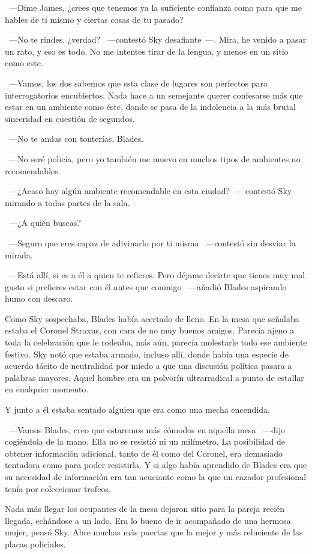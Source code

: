 ~---Dime James, ¿crees que tenemos ya la suficiente confianza como para que me hables de ti mismo y ciertas cosas de tu pasado?

~---No te rindes, ¿verdad? ~---contestó Sky desafiante~---. Mira, he venido a pasar un rato, y eso es todo. No me intentes tirar de la lengua, y menos en un sitio como este.

~---Vamos, los dos sabemos que esta clase de lugares son perfectos para interrogatorios encubiertos. Nada hace a un semejante querer confesarse más que estar en un ambiente como éste, donde se pasa de la indolencia a la más brutal sinceridad en cuestión de segundos.

~---No te andas con tonterías, Blades.

~---No seré policía, pero yo también me muevo en muchos tipos de ambientes no recomendables.

~---¿Acaso hay algún ambiente recomendable en esta ciudad? ~---contestó Sky mirando a todas partes de la sala.

~---¿A quién buscas?

~---Seguro que eres capaz de adivinarlo por ti misma ~---contestó sin desviar la mirada.

~---Está allí, si es a él a quien te refieres. Pero déjame decirte que tienes muy mal gusto si prefieres estar con él antes que conmigo ~---añadió Blades aspirando humo con descaro.

Como Sky sospechaba, Blades había acertado de lleno. En la mesa que señalaba estaba el Coronel Straxus, con cara de no muy buenos amigos. Parecía ajeno a toda la celebración que le rodeaba, más aún, parecía molestarle todo ese ambiente festivo. Sky notó que estaba armado, incluso allí, donde había una especie de acuerdo tácito de neutralidad por miedo a que una discusión política pasara a palabras mayores. Aquel hombre era un polvorín ultrarradical a punto de estallar en cualquier momento.

Y junto a él estaba sentado alguien que era como una mecha encendida.

~---Vamos Blades, creo que estaremos más cómodos en aquella mesa ~---dijo cogiéndola de la mano. Ella no se resistió ni un milímetro. La posibilidad de obtener información adicional, tanto de él como del Coronel, era demasiado tentadora como para poder resistirla. Y si algo había aprendido de Blades era que su necesidad de información era tan acuciante como la que un cazador profesional tenía por coleccionar trofeos.

Nada más llegar los ocupantes de la mesa dejaron sitio para la pareja recién llegada, echándose a un lado. Era lo bueno de ir acompañado de una hermosa mujer, pensó Sky. Abre muchas más puertas que la mejor y más reluciente de las placas policiales.

